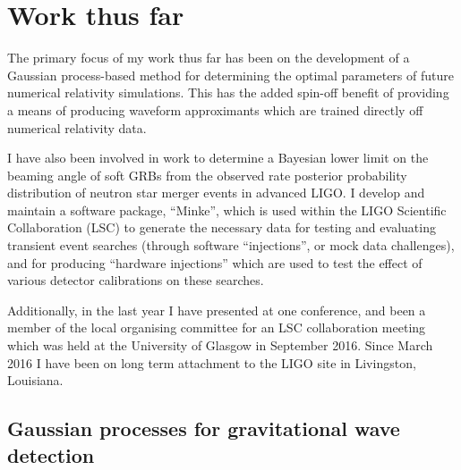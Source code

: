 \documentclass[openleft]{kentigern}
\theoremstyle{definition}
\begin{document}




\chapter{Work thus far}
\chapterprecis{}
The primary focus of my work thus far has been on the development of a
Gaussian process-based method for determining the optimal parameters
of future numerical relativity simulations. This has the added
spin-off benefit of providing a means of producing waveform
approximants which are trained directly off numerical relativity data.

I have also been involved in work to determine a Bayesian lower limit
on the beaming angle of soft GRBs from the observed rate posterior
probability distribution of neutron star merger events in advanced
LIGO. I develop and maintain a software package, ``Minke'', which is
used within the LIGO Scientific Collaboration (LSC) to generate the
necessary data for testing and evaluating transient event searches
(through software ``injections'', or mock data challenges), and for
producing ``hardware injections'' which are used to test the effect of
various detector calibrations on these searches.

Additionally, in the last year I have presented at one conference, and
been a member of the local organising committee for an LSC
collaboration meeting which was held at the University of Glasgow in
September 2016. Since March 2016 I have been on long term attachment
to the LIGO site in Livingston, Louisiana.

\section{Gaussian processes for gravitational wave detection}
\label{sec:gauss-proc-grav}
\end{document}
